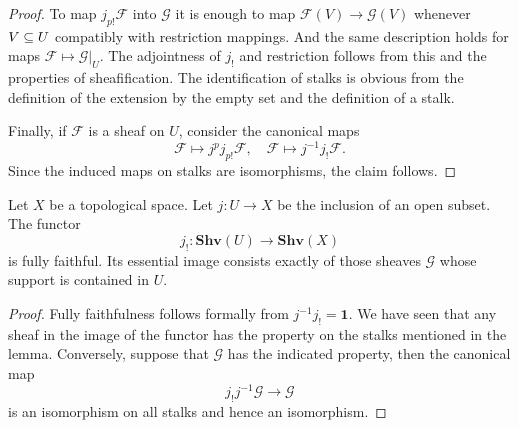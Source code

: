 \begin{proof}
To map $j_{p!}\mathscr{F}$ into $\mathscr{G}$ it is enough to map $\mathscr{F}(V)\to\mathscr{G}(V)$ whenever $V\subseteq U$ compatibly with restriction mappings. And the same description holds for maps $\mathscr{F}\mapsto\mathscr{G}|_U$. The adjointness of $j_!$ and restriction follows from this and the properties of sheafification. The identification of stalks is obvious from the definition of the extension by the empty set and the definition of a stalk.\par
Finally, if $\mathscr{F}$ is a sheaf on $U$, consider the canonical maps
\[\mathscr{F}\mapsto j^pj_{p!}\mathscr{F},\quad\mathscr{F}\mapsto j^{-1}j_{!}\mathscr{F}.\]
Since the induced maps on stalks are isomorphisms, the claim follows.
\end{proof}
\begin{theorem}\label{sheaf open extension fully faithful essential image char}
Let $X$ be a topological space. Let $j:U\to X$ be the inclusion of an open subset. The functor
\[j_!:\mathbf{Shv}(U)\to\mathbf{Shv}(X)\]
is fully faithful. Its essential image consists exactly of those sheaves $\mathscr{G}$ whose support is contained in $U$.
\end{theorem}
\begin{proof}
Fully faithfulness follows formally from $j^{-1}j_!=\mathbf{1}$. We have seen that any sheaf in the image of the functor has the property on the stalks mentioned in the lemma. Conversely, suppose that $\mathscr{G}$ has the indicated property, then the canonical map
\[j_!j^{-1}\mathscr{G}\to\mathscr{G}\]
is an isomorphism on all stalks and hence an isomorphism.
\end{proof}
